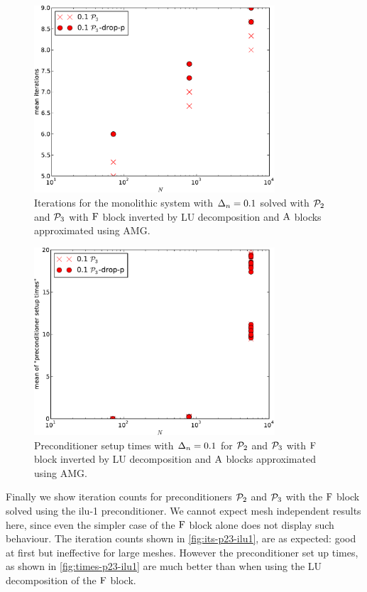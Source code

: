 \begin{figure}
  \centering
  \includegraphics[width=0.8\textwidth]{plots/linear_solvers_p2p3/implicitexact-meanofnsolveritersvsinitialnnode.pdf}
  \caption{Iterations for the monolithic system with $\Delta_{n}=0.1$ solved with $\mathcal{P}_2$ and $\mathcal{P}_3$ with $\mathrm{F}$ block inverted by LU decomposition and $\mathrm{A}$ blocks approximated using AMG.}
  \label{fig:its-p23-exact}
\end{figure}

\begin{figure}
  \centering
  \includegraphics[width=0.8\textwidth]{plots/linear_solvers_p2p3/implicitexact-meanofpreconditionersetuptimesvsinitialnnode.pdf}
  \caption{Preconditioner setup times with $\Delta_{n}=0.1$ for $\mathcal{P}_2$ and $\mathcal{P}_3$ with $\mathrm{F}$ block inverted by LU decomposition and $\mathrm{A}$ blocks approximated using AMG.}
  \label{fig:times-p23-exact}
\end{figure}


Finally we show iteration counts for preconditioners $\mathcal{P}_2$ and $\mathcal{P}_3$ with the $\mathrm{F}$ block solved using the ilu-1 preconditioner.
We cannot expect mesh independent results here, since even the simpler case of the $\mathrm{F}$ block alone does not display such behaviour.
The iteration counts shown in \cref{fig:its-p23-ilu1}, are as expected: good at first but ineffective for large meshes.
However the preconditioner set up times, as shown in \cref{fig:times-p23-ilu1} are much better than when using the LU decomposition of the $\mathrm{F}$ block. 

